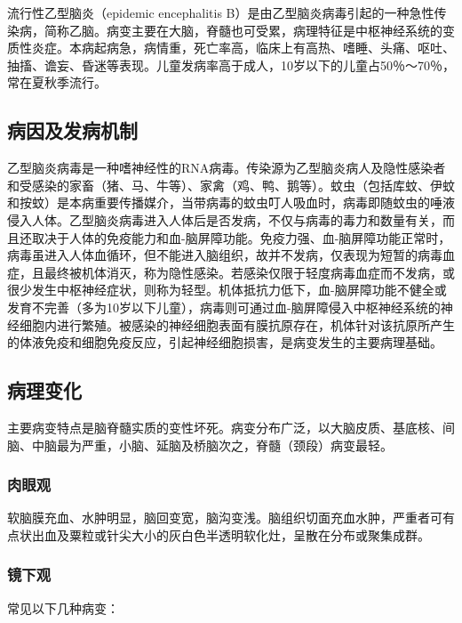 流行性乙型脑炎（epidemic encephalitis
B）是由乙型脑炎病毒引起的一种急性传染病，简称乙脑。病变主要在大脑，脊髓也可受累，病理特征是中枢神经系统的变质性炎症。本病起病急，病情重，死亡率高，临床上有高热、嗜睡、头痛、呕吐、抽搐、谵妄、昏迷等表现。儿童发病率高于成人，10岁以下的儿童占50％～70％，常在夏秋季流行。

\subsection{病因及发病机制}

乙型脑炎病毒是一种嗜神经性的RNA病毒。传染源为乙型脑炎病人及隐性感染者和受感染的家畜（猪、马、牛等）、家禽（鸡、鸭、鹅等）。蚊虫（包括库蚊、伊蚊和按蚊）是本病重要传播媒介，当带病毒的蚊虫叮人吸血时，病毒即随蚊虫的唾液侵入人体。乙型脑炎病毒进入人体后是否发病，不仅与病毒的毒力和数量有关，而且还取决于人体的免疫能力和血-脑屏障功能。免疫力强、血-脑屏障功能正常时，病毒虽进入人体血循环，但不能进入脑组织，故并不发病，仅表现为短暂的病毒血症，且最终被机体消灭，称为隐性感染。若感染仅限于轻度病毒血症而不发病，或很少发生中枢神经症状，则称为轻型。机体抵抗力低下，血-脑屏障功能不健全或发育不完善（多为10岁以下儿童），病毒则可通过血-脑屏障侵入中枢神经系统的神经细胞内进行繁殖。被感染的神经细胞表面有膜抗原存在，机体针对该抗原所产生的体液免疫和细胞免疫反应，引起神经细胞损害，是病变发生的主要病理基础。

\subsection{病理变化}

主要病变特点是脑脊髓实质的变性坏死。病变分布广泛，以大脑皮质、基底核、间脑、中脑最为严重，小脑、延脑及桥脑次之，脊髓（颈段）病变最轻。

\subsubsection{肉眼观}

软脑膜充血、水肿明显，脑回变宽，脑沟变浅。脑组织切面充血水肿，严重者可有点状出血及粟粒或针尖大小的灰白色半透明软化灶，呈散在分布或聚集成群。

\subsubsection{镜下观}

常见以下几种病变：

